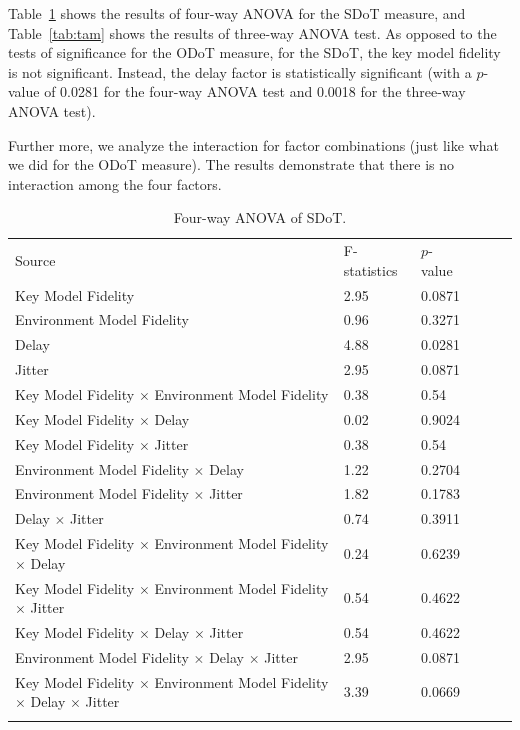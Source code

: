 Table~\ref{tab:fam} shows the results of four-way ANOVA for the SDoT measure, and Table~\ref{tab:tam} shows the results of three-way ANOVA test.
As opposed to the tests of significance for the ODoT measure, for the SDoT, the key model fidelity is not significant. Instead, the delay factor is statistically significant (with a $p$-value of 0.0281 for the four-way ANOVA test and 0.0018 for the three-way ANOVA test).

Further more, we analyze the interaction for factor combinations (just like what we did for the ODoT measure).
The results demonstrate that there is no interaction among the four factors.

\begin{table}[!htbp]
\caption{Four-way ANOVA of SDoT.}
\label{tab:fam}
\begin{tabular}{llllll}
\hline\noalign{\smallskip}
Source & F-statistics & $p$-value \\
\noalign{\smallskip}\hline\noalign{\smallskip}
Key Model Fidelity & 2.95 & 0.0871 \\
Environment Model Fidelity & 0.96 & 0.3271 \\
Delay & 4.88 & 0.0281 \\
Jitter & 2.95 & 0.0871 \\
Key Model Fidelity $\times$ Environment Model Fidelity & 0.38 & 0.54 \\
Key Model Fidelity $\times$ Delay & 0.02 & 0.9024 \\
Key Model Fidelity $\times$ Jitter & 0.38 & 0.54 \\
Environment Model Fidelity $\times$ Delay & 1.22 & 0.2704 \\
Environment Model Fidelity $\times$ Jitter & 1.82 & 0.1783 \\
Delay $\times$ Jitter & 0.74 & 0.3911 \\
Key Model Fidelity $\times$ Environment Model Fidelity $\times$ Delay & 0.24 & 0.6239 \\
Key Model Fidelity $\times$ Environment Model Fidelity $\times$ Jitter & 0.54 & 0.4622 \\
Key Model Fidelity $\times$ Delay $\times$ Jitter & 0.54 & 0.4622 \\
Environment Model Fidelity $\times$ Delay $\times$ Jitter & 2.95 & 0.0871 \\
Key Model Fidelity $\times$ Environment Model Fidelity $\times$ Delay $\times$ Jitter & 3.39 & 0.0669 \\
\noalign{\smallskip}\hline
\end{tabular}
\end{table}


